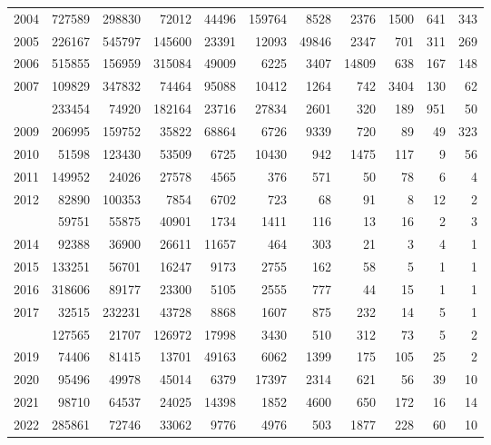 \documentclass[
]{article}
\begin{document}
\begin{longtable}[t]{lrrrrrrrrrr}
2004 & 727589 & 298830 & 72012 & 44496 & 159764 & 8528 & 2376 & 1500 & 641 & 343\\
2005 & 226167 & 545797 & 145600 & 23391 & 12093 & 49846 & 2347 & 701 & 311 & 269\\
2006 & 515855 & 156959 & 315084 & 49009 & 6225 & 3407 & 14809 & 638 & 167 & 148\\
2007 & 109829 & 347832 & 74464 & 95088 & 10412 & 1264 & 742 & 3404 & 130 & 62\\
\addlinespace
2008 & 233454 & 74920 & 182164 & 23716 & 27834 & 2601 & 320 & 189 & 951 & 50\\
2009 & 206995 & 159752 & 35822 & 68864 & 6726 & 9339 & 720 & 89 & 49 & 323\\
2010 & 51598 & 123430 & 53509 & 6725 & 10430 & 942 & 1475 & 117 & 9 & 56\\
2011 & 149952 & 24026 & 27578 & 4565 & 376 & 571 & 50 & 78 & 6 & 4\\
2012 & 82890 & 100353 & 7854 & 6702 & 723 & 68 & 91 & 8 & 12 & 2\\
\addlinespace
2013 & 59751 & 55875 & 40901 & 1734 & 1411 & 116 & 13 & 16 & 2 & 3\\
2014 & 92388 & 36900 & 26611 & 11657 & 464 & 303 & 21 & 3 & 4 & 1\\
2015 & 133251 & 56701 & 16247 & 9173 & 2755 & 162 & 58 & 5 & 1 & 1\\
2016 & 318606 & 89177 & 23300 & 5105 & 2555 & 777 & 44 & 15 & 1 & 1\\
2017 & 32515 & 232231 & 43728 & 8868 & 1607 & 875 & 232 & 14 & 5 & 1\\
\addlinespace
2018 & 127565 & 21707 & 126972 & 17998 & 3430 & 510 & 312 & 73 & 5 & 2\\
2019 & 74406 & 81415 & 13701 & 49163 & 6062 & 1399 & 175 & 105 & 25 & 2\\
2020 & 95496 & 49978 & 45014 & 6379 & 17397 & 2314 & 621 & 56 & 39 & 10\\
2021 & 98710 & 64537 & 24025 & 14398 & 1852 & 4600 & 650 & 172 & 16 & 14\\
2022 & 285861 & 72746 & 33062 & 9776 & 4976 & 503 & 1877 & 228 & 60 & 10\\*
\end{longtable}
\end{document}
